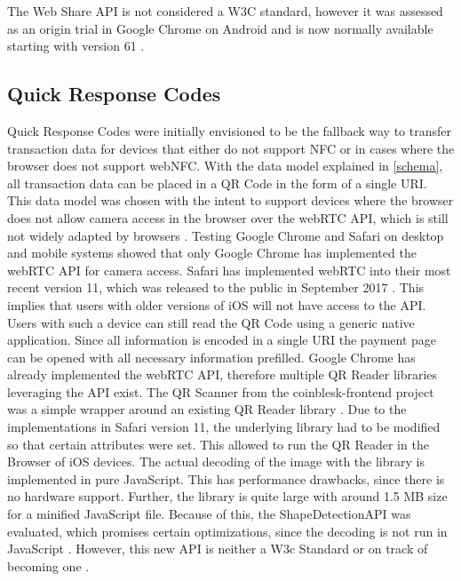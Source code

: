 The Web Share API is not considered a W3C standard, however it was assessed as an origin trial in Google Chrome on Android and is now normally available starting with version 61 \cite{webshareapi}\cite{websharespec}.


\subsection{Quick Response Codes}\label{qrcodes}
Quick Response Codes were initially envisioned to be the fallback way to transfer transaction data for devices that either do not support NFC or in cases where the browser does not support webNFC. With the data model explained in \ref{schema}, all transaction data can be placed in a QR Code in the form of a single URI.
This data model was chosen with the intent to support devices where the browser does not allow camera access in the browser over the webRTC API, which is still not widely adapted by browsers \cite{webrtcimplreport}. Testing Google Chrome and Safari on desktop and mobile systems showed that only Google Chrome has implemented the webRTC API for camera access. Safari has  implemented webRTC into their most recent version 11, which was released to the public in September 2017  \cite{safari11release}\cite{ios11release}. This implies that users with older versions of iOS will not have access to the API. Users with such a device can still read the QR Code using a generic native application. Since all information is encoded in a single URI the payment page can be opened with all necessary information prefilled.
Google Chrome has already implemented the webRTC API, therefore multiple QR Reader libraries leveraging the API exist.
The QR Scanner from the coinblesk-frontend project was a simple wrapper around an existing QR Reader library \cite{instascan}. Due to the implementations in Safari version 11, the underlying library had to be modified so that certain attributes were set. This allowed to run the QR Reader in the Browser of iOS devices. The actual decoding of the image with the library is implemented in pure JavaScript. This has performance drawbacks, since there is no hardware support. Further, the library is quite large with around 1.5 MB size for a minified JavaScript file. Because of this, the ShapeDetectionAPI was evaluated, which promises certain optimizations, since the decoding is not run in JavaScript \cite{shapeapinotes}. However, this new API is neither a W3c Standard or on track of becoming one \cite{shapeapispec}.

